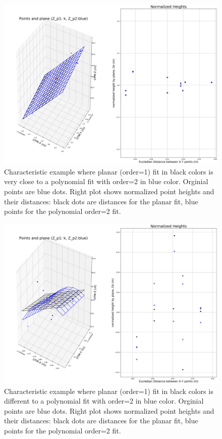 \documentclass[a4paperpaper,,tablecaptionabove]{scrartcl}
\begin{document}
\begin{figure}
\centering
\includegraphics[width=\textwidth,height=0.9\textheight]{./tex2pdf.-e6884bf2dada0f3b/acbc77d9932d9a3aa0ebe41a783a59e2cb53bbe3.png}
\caption{Characteristic example where planar (order=1) fit in black
colors is very close to a polynomial fit with order=2 in blue color.
Orginial points are blue dots. Right plot shows normalized point heights
and their distances: black dots are distances for the planar fit, blue
points for the polynomial order=2 fit.\label{Fig:PlaneFit_seed00020326}}
\end{figure}

\begin{figure}
\centering
\includegraphics[width=\textwidth,height=0.9\textheight]{./tex2pdf.-e6884bf2dada0f3b/060d9cb1751811d975677e7d1c8025b5f6fe3b25.png}
\caption{Characteristic example where planar (order=1) fit in black
colors is different to a polynomial fit with order=2 in blue color.
Orginial points are blue dots. Right plot shows normalized point heights
and their distances: black dots are distances for the planar fit, blue
points for the polynomial order=2 fit.\label{Fig:PlaneFit_seed00020319}}
\end{figure}
\end{document}
